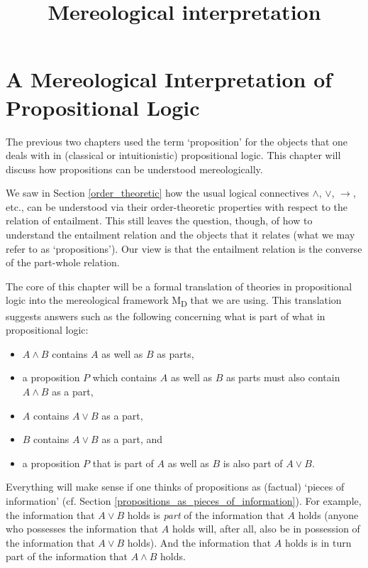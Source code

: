 \documentclass[12pt]{book}
\title{Mereological interpretation}
\author{}
\begin{document}
\maketitle


\chapter{A Mereological Interpretation of Propositional Logic} \label{interpretation_of_propositional_logic}

The previous two chapters used the term ‘proposition’ for the objects that one deals with in (classical or intuitionistic) propositional logic. This chapter will discuss how propositions can be understood mereologically.

We saw in Section \ref{order_theoretic} how the usual logical connectives $\wedge$, $\vee$, $\rightarrow$, etc., can be understood via their order-theoretic properties with respect to the relation of entailment. This still leaves the question, though, of how to understand the entailment relation and the objects that it relates (what we may refer to as `propositions'). Our view is that the entailment relation is the converse of the part-whole relation.

The core of this chapter will be a formal translation of theories in propositional logic into the mereological framework M\textsubscript{D} that we are using. This translation suggests answers such as the following concerning what is part of what in propositional logic:
\begin{itemize}
	\item $A \wedge B$ contains $A$ as well as $B$ as parts,

	\item a proposition $P$ which contains $A$ as well as $B$ as parts must also contain $A \wedge B$ as a part,

	\item $A$ contains $A \vee B$ as a part,

	\item $B$ contains $A \vee B$ as a part, and

	\item a proposition $P$ that is part of $A$ as well as $B$ is also part of $A \vee B$.

\end{itemize}

Everything will make sense if one thinks of propositions as (factual) ‘pieces of information’ (cf. Section \ref{propositions_as_pieces_of_information}). For example, the information that $A \vee B$ holds is \textit{part} of the information that $A$ holds (anyone who possesses the information that $A$ holds will, after all, also be in possession of the information that $A \vee B$ holds). And the information that $A$ holds is in turn part of the information that $A \wedge B$ holds.
\end{document}
